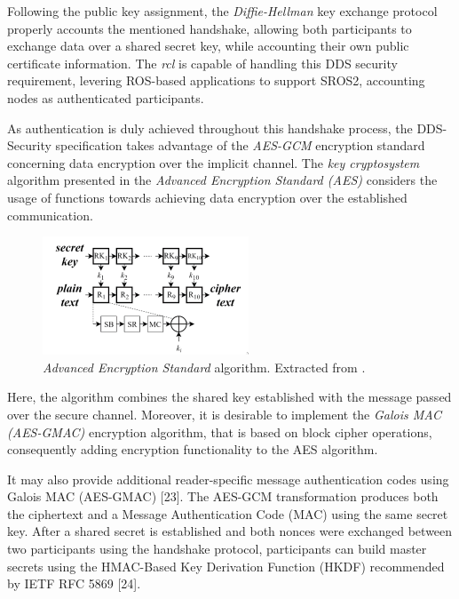 Following the public key assignment, the \textit{Diffie-Hellman} key exchange protocol properly accounts the mentioned handshake, allowing both participants to exchange data over a shared secret key, while accounting their own public certificate information. \cite{kim2018security} The \textit{rcl} is capable of handling this DDS security requirement, levering ROS-based applications to support SROS2, accounting nodes as authenticated participants. \cite{white2016sros}

As authentication is duly achieved throughout this handshake process, the DDS-Security specification takes advantage of the \textit{AES-GCM} encryption standard concerning data encryption over the implicit channel. \cite{kim2018security, takemoto2019performance} The \textit{key cryptosystem} algorithm \cite{takemoto2019performance} presented in the \textit{Advanced Encryption Standard (AES)} considers the usage of functions towards achieving data encryption over the established communication. 

\begin{figure}[H]
    \centering
    \includegraphics[width=0.4\linewidth]{images/ros_aes.png}
    \caption{\textit{Advanced Encryption Standard} algorithm. Extracted from \cite{takemoto2019performance}.}
    \label{fig:ros_aes}
\end{figure}

Here, the algorithm combines the shared key established with the message passed over the secure channel. Moreover, it is desirable to implement the \textit{Galois MAC (AES-GMAC)} encryption algorithm, that is based on block cipher operations, consequently adding encryption functionality to the AES algorithm. \cite{takemoto2019performance, kim2018security}

It may also provide additional reader-specific message authentication codes using Galois MAC (AES-GMAC) [23]. The AES-GCM transformation produces both the ciphertext and a Message Authentication Code (MAC) using the same secret key. After a shared secret is established and both nonces were exchanged between two participants using the handshake protocol, participants can build master secrets using the HMAC-Based Key Derivation Function (HKDF) recommended by IETF RFC 5869 [24].

